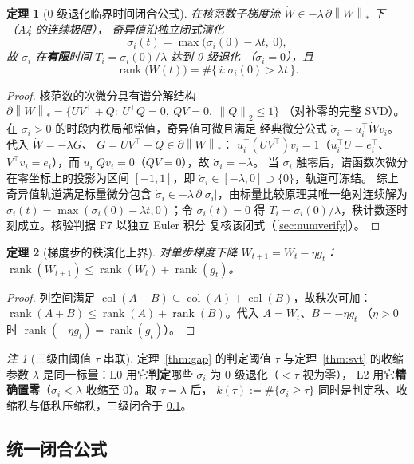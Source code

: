 \documentclass[UTF8,11pt,a4paper]{ctexart}
\theoremstyle{plain}
\newtheorem{theorem}{定理}
\theoremstyle{definition}
\theoremstyle{remark}
\newtheorem{remark}{注}
\newcommand{\rank}{\operatorname{rank}}
\newcommand{\colsp}{\operatorname{col}}
\newcommand{\Tnorm}[1]{\left\lVert #1\right\rVert_2}
\newcommand{\Nnorm}[1]{\left\lVert #1\right\rVert_{*}}
\begin{document}
\begin{theorem}[0 级退化临界时间闭合公式]\label{thm:critical}
在核范数子梯度流 $\dot W\in-\lambda\,\partial\Nnorm{W}$ 下（A4 的连续极限），
奇异值沿独立闭式演化
\[
\sigma_i(t)=\max\big(\sigma_i(0)-\lambda t,\ 0\big),
\]
故 $\sigma_i$ 在\textbf{有限}时间 $T_i=\sigma_i(0)/\lambda$ 达到 0 级退化
（$\sigma_i=0$），且
\[
\rank\big(W(t)\big)=\#\{\,i:\sigma_i(0)>\lambda t\,\}.
\]
\end{theorem}
\begin{proof}
核范数的次微分具有谱分解结构
$\partial\Nnorm{W}=\{UV^\top+Q:\ U^\top Q=0,\ QV=0,\ \Tnorm{Q}\le1\}$
（对补零的完整 SVD）。在 $\sigma_i>0$ 的时段内秩局部常值，奇异值可微且满足
经典微分公式 $\dot\sigma_i=u_i^\top\dot Wv_i$。代入 $\dot W=-\lambda G$、
$G=UV^\top+Q\in\partial\Nnorm{W}$：
$u_i^\top(UV^\top)v_i=1$（$u_i^\top U=e_i^\top$、$V^\top v_i=e_i$），而
$u_i^\top Qv_i=0$（$QV=0$），故 $\dot\sigma_i=-\lambda$。
当 $\sigma_i$ 触零后，谱函数次微分在零坐标上的投影为区间
$[-1,1]$，即 $\dot\sigma_i\in[-\lambda,0]\supset\{0\}$，轨道可冻结。
综上奇异值轨道满足标量微分包含
$\dot\sigma_i\in-\lambda\,\partial|\sigma_i|$，由标量比较原理其唯一绝对连续解为
$\sigma_i(t)=\max(\sigma_i(0)-\lambda t,0)$；令 $\sigma_i(t)=0$ 得
$T_i=\sigma_i(0)/\lambda$，秩计数逐时刻成立。核验判据 F7 以独立 Euler 积分
复核该闭式（\textsection\ref{sec:numverify}）。
\end{proof}

\begin{theorem}[梯度步的秩演化上界]\label{thm:gradrank}
对单步梯度下降 $W_{t+1}=W_t-\eta g_t$：
$\rank(W_{t+1})\le\rank(W_t)+\rank(g_t)$。
\end{theorem}
\begin{proof}
列空间满足 $\colsp(A+B)\subseteq\colsp(A)+\colsp(B)$，故秩次可加：
$\rank(A+B)\le\rank(A)+\rank(B)$。代入 $A=W_t$、$B=-\eta g_t$
（$\eta>0$ 时 $\rank(-\eta g_t)=\rank(g_t)$）。
\end{proof}

\begin{remark}[三级由阈值 $\tau$ 串联]\label{rem:chain}
定理~\ref{thm:gap} 的判定阈值 $\tau$ 与定理~\ref{thm:svt} 的收缩参数 $\lambda$
是同一标量：L0 用它\textbf{判定}哪些 $\sigma_i$ 为 0 级退化（$<\tau$ 视为零），
L2 用它\textbf{精确置零}（$\sigma_i<\lambda$ 收缩至 0）。取 $\tau=\lambda$ 后，
$k(\tau):=\#\{\sigma_i\ge\tau\}$ 同时是判定秩、收缩秩与低秩压缩秩，三级闭合于
\textsection\ref{sec:main:unified}。
\end{remark}

\subsection{统一闭合公式}\label{sec:main:unified}
\end{document}
